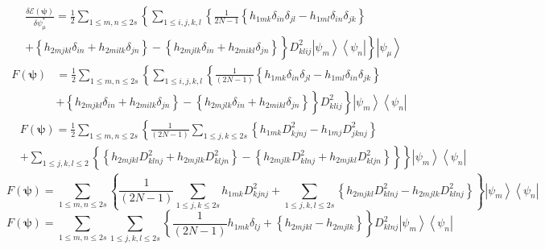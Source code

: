 \documentclass[aps,preprint]{revtex4}%
\begin{document}
\begin{align}
&  \frac{\delta\mathcal{E}\left(  \mathbf{\psi}\right)  }{\delta\psi_{\mu
}^{\ast}}=\frac{1}{2}\sum_{1\leq m,n\leq2s}\left\{  \sum_{1\leq i,j,k,l}%
\left\{  \frac{1}{2N-1}\left\{  h_{1mk}\delta_{in}\delta_{jl}-h_{1ml}%
\delta_{in}\delta_{jk}\right\}  \right.  \right. \\
&  +\left.  \left.  \overset{}{\left\{  h_{2mjkl}\delta_{in}+h_{2milk}%
\delta_{jn}\right\}  -\left\{  h_{2mjlk}\delta_{in}+h_{2mikl}\delta
_{jn}\right\}  }\right\}  D_{klij}^{2}\left\vert \psi_{m}\right\rangle
\left\langle \psi_{n}\right\vert \right\}  \left\vert \psi_{\mu}\right\rangle
\end{align}%
\begin{align}
F\left(  \mathbf{\psi}\right)   &  =\frac{1}{2}\sum_{1\leq m,n\leq2s}\left\{
\sum_{1\leq i,j,k,l}\left\{  \frac{1}{\left(  2N-1\right)  }\left\{
h_{1mk}\delta_{in}\delta_{jl}-h_{1ml}\delta_{in}\delta_{jk}\right\}  \right.
\right. \\
&  +\left.  \left.  \overset{}{\left\{  h_{2mjkl}\delta_{in}+h_{2milk}%
\delta_{jn}\right\}  -\left\{  h_{2mjlk}\delta_{in}+h_{2mikl}\delta
_{jn}\right\}  }\right\}  D_{klij}^{2}\right\}  \left\vert \psi_{m}%
\right\rangle \left\langle \psi_{n}\right\vert
\end{align}%
\begin{align}
&  F\left(  \mathbf{\psi}\right)  =\frac{1}{2}\sum_{1\leq m,n\leq2s}\left\{
\frac{1}{\left(  2N-1\right)  }\sum_{1\leq j,k\leq2s}\left\{  h_{1mk}%
D_{kjnj}^{2}-h_{1mj}D_{jknj}^{2}\right\}  \right. \\
&  +\left.  \sum_{1\leq j,k,l\leq2}\left\{  \overset{}{\left\{  h_{2mjkl}%
D_{klnj}^{2}+h_{2mjlk}D_{kljn}^{2}\right\}  -\left\{  h_{2mjlk}D_{klnj}%
^{2}+h_{2mjkl}D_{kljn}^{2}\right\}  }\right\}  \right\}  \left\vert \psi
_{m}\right\rangle \left\langle \psi_{n}\right\vert
\end{align}%
\begin{equation}
F\left(  \mathbf{\psi}\right)  =\sum_{1\leq m,n\leq2s}\left\{  \frac
{1}{\left(  2N-1\right)  }\sum_{1\leq j,k\leq2s}h_{1mk}D_{kjnj}^{2}%
+\sum_{1\leq j,k,l\leq2s}\overset{}{\left\{  h_{2mjkl}D_{klnj}^{2}%
-h_{2mjlk}D_{klnj}^{2}\right\}  }\right\}  \left\vert \psi_{m}\right\rangle
\left\langle \psi_{n}\right\vert
\end{equation}%
\begin{equation}
F\left(  \mathbf{\psi}\right)  =\sum_{1\leq m,n\leq2s}\sum_{1\leq j,k,l\leq
2s}\left\{  \frac{1}{\left(  2N-1\right)  }h_{1mk}\delta_{lj}+\overset
{}{\left\{  h_{2mjkl}-h_{2mjlk}\right\}  }\right\}  D_{klnj}^{2}\left\vert
\psi_{m}\right\rangle \left\langle \psi_{n}\right\vert
\end{equation}%
\end{document}
